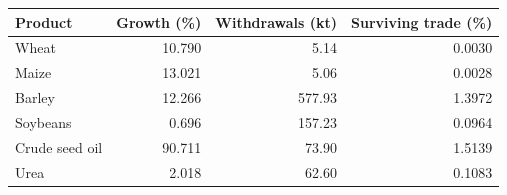 \begin{tabular}{lrrr}
\toprule
Product & Growth (\%) & Withdrawals (kt) & Surviving trade (\%) \\
\midrule
Wheat & 10.790 & 5.14 & 0.0030 \\
Maize & 13.021 & 5.06 & 0.0028 \\
Barley & 12.266 & 577.93 & 1.3972 \\
Soybeans & 0.696 & 157.23 & 0.0964 \\
Crude seed oil & 90.711 & 73.90 & 1.5139 \\
Urea & 2.018 & 62.60 & 0.1083 \\
\bottomrule
\end{tabular}
